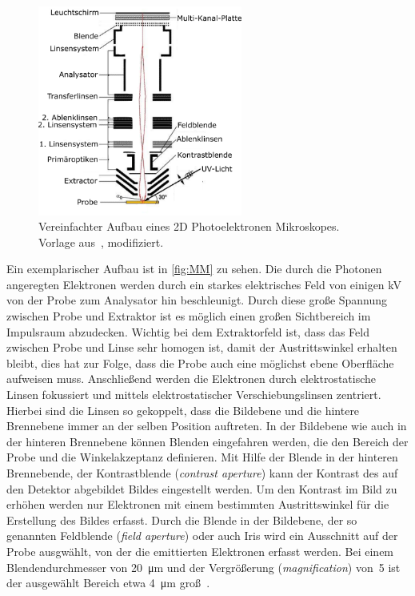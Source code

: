         \begin{figure}
            \centering
            \includegraphics[width=0.6\textwidth]{PEEM_schemaneu.png}
            \caption{Vereinfachter Aufbau eines 2D Photoelektronen Mikroskopes. Vorlage aus~\cite{KUCH}, modifiziert.}
            \label{fig:MM}
        \end{figure}
        Ein exemplarischer Aufbau ist in \autoref{fig:MM} zu sehen.
        Die durch die Photonen angeregten Elektronen werden durch ein starkes elektrisches Feld von einigen \si{\kilo\volt} von der Probe zum Analysator hin beschleunigt.
        Durch diese große Spannung zwischen Probe und Extraktor ist es möglich einen großen Sichtbereich im Impulsraum abzudecken.
        Wichtig bei dem Extraktorfeld ist, dass das Feld zwischen Probe und Linse sehr homogen ist, damit der Austrittswinkel erhalten bleibt, dies hat zur Folge, dass die Probe auch eine möglichst ebene Oberfläche aufweisen muss.
        Anschließend werden die Elektronen durch elektrostatische Linsen fokussiert und mittels elektrostatischer Verschiebungslinsen zentriert.
        Hierbei sind die Linsen so gekoppelt, dass die Bildebene und die hintere Brennebene immer an der selben Position auftreten.
        In der Bildebene wie auch in der hinteren Brennebene können Blenden eingefahren werden, die den Bereich der Probe und die Winkelakzeptanz definieren.
        Mit Hilfe der Blende in der hinteren Brennebende, der Kontrastblende (\textit{contrast aperture}) kann der Kontrast des auf den Detektor abgebildet Bildes eingestellt werden.
        Um den Kontrast im Bild zu erhöhen werden nur Elektronen mit einem bestimmten Austrittswinkel für die Erstellung des Bildes erfasst.
        Durch die Blende in der Bildebene, der so genannten Feldblende (\textit{field aperture}) oder auch Iris wird ein Ausschnitt auf der Probe ausgwählt, von der die emittierten Elektronen erfasst werden.
        Bei einem Blendendurchmesser von \SI{20}{\micro\meter} und der Vergrößerung (\textit{magnification}) von~\num{5} ist der ausgewählt Bereich etwa \SI{4}{\micro\meter} groß~\cite{SPECS-MM}.

